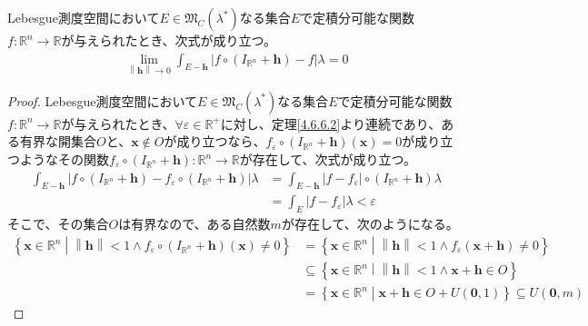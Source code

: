 \documentclass[dvipdfmx]{jsarticle}
\begin{document}
\begin{thm}\label{4.6.6.4}
Lebesgue測度空間において$E \in \mathfrak{M}_{C}\left( \lambda^{*} \right)$なる集合$E$で定積分可能な関数$f:\mathbb{R}^{n} \rightarrow \mathbb{R}$が与えられたとき、次式が成り立つ。
\begin{align*}
\lim_{\left\| \mathbf{h} \right\| \rightarrow 0}{\int_{E - \mathbf{h}} {\left| f \circ \left( I_{\mathbb{R}^{n}} + \mathbf{h} \right) - f \right|\lambda}} = 0
\end{align*}
\end{thm}
\begin{proof}
Lebesgue測度空間において$E \in \mathfrak{M}_{C}\left( \lambda^{*} \right)$なる集合$E$で定積分可能な関数$f:\mathbb{R}^{n} \rightarrow \mathbb{R}$が与えられたとき、$\forall\varepsilon \in \mathbb{R}^{+}$に対し、定理\ref{4.6.6.2}より連続であり、ある有界な開集合$O$と、$\mathbf{x} \notin O$が成り立つなら、$f_{\varepsilon} \circ \left( I_{\mathbb{R}^{n}} + \mathbf{h} \right)\left( \mathbf{x} \right) = 0$が成り立つようなその関数$f_{\varepsilon} \circ \left( I_{\mathbb{R}^{n}} + \mathbf{h} \right):\mathbb{R}^{n} \rightarrow \mathbb{R}$が存在して、次式が成り立つ。
\begin{align*}
\int_{E - \mathbf{h}} {\left| f \circ \left( I_{\mathbb{R}^{n}} + \mathbf{h} \right) - f_{\varepsilon} \circ \left( I_{\mathbb{R}^{n}} + \mathbf{h} \right) \right|\lambda} &= \int_{E - \mathbf{h}} {\left| f - f_{\varepsilon} \right| \circ \left( I_{\mathbb{R}^{n}} + \mathbf{h} \right)\lambda}\\
&= \int_{E} {\left| f - f_{\varepsilon} \right|\lambda} < \varepsilon
\end{align*}
そこで、その集合$O$は有界なので、ある自然数$m$が存在して、次のようになる。
\begin{align*}
\left\{ \mathbf{x} \in \mathbb{R}^{n} \middle| \left\| \mathbf{h} \right\| < 1 \land f_{\varepsilon} \circ \left( I_{\mathbb{R}^{n}} + \mathbf{h} \right)\left( \mathbf{x} \right) \neq 0 \right\} &= \left\{ \mathbf{x} \in \mathbb{R}^{n} \middle| \left\| \mathbf{h} \right\| < 1 \land f_{\varepsilon}\left( \mathbf{x} + \mathbf{h} \right) \neq 0 \right\}\\
&\subseteq \left\{ \mathbf{x} \in \mathbb{R}^{n} \middle| \left\| \mathbf{h} \right\| < 1 \land \mathbf{x} + \mathbf{h} \in O \right\}\\
&= \left\{ \mathbf{x} \in \mathbb{R}^{n} \middle| \mathbf{x} + \mathbf{h} \in O + U\left( \mathbf{0},1 \right) \right\} \subseteq U\left( \mathbf{0},m \right)
\end{align*}

\end{proof}
\end{document}
